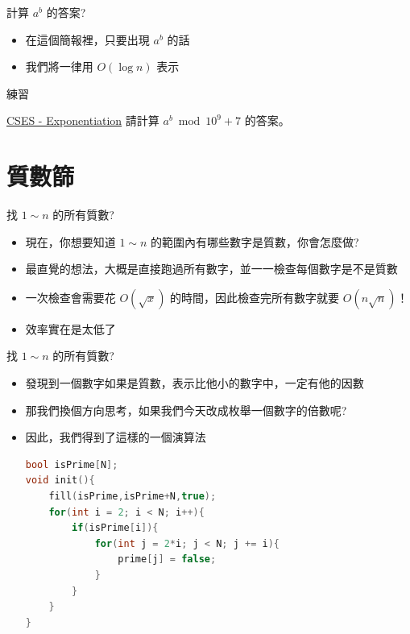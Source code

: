 \documentclass[aspectratio=169]{beamer}
\begin{document}
    \begin{frame}[fragile]{計算 $a^b$ 的答案?}
        \begin{itemize}
            \item 在這個簡報裡，只要出現 $a^b$ 的話
            \item 我們將一律用 $O(\log n)$ 表示
        \end{itemize}
    \end{frame}
    
    \begin{frame}[fragile]{練習}
        \begin{block}{\href{https://cses.fi/problemset/task/1095}{CSES - Exponentiation}}
            請計算 $a^b \bmod 10^9+7$ 的答案。
        \end{block}
    \end{frame}
    
    \section{質數篩}
    
    \begin{frame}{找 $1 \sim n$ 的所有質數?}
        \begin{itemize}
            \item 現在，你想要知道 $1 \sim n$ 的範圍內有哪些數字是質數，你會怎麼做?
            \item<2-> 最直覺的想法，大概是直接跑過所有數字，並一一檢查每個數字是不是質數
            \item<3-> 一次檢查會需要花 $O(\sqrt{x})$ 的時間，因此檢查完所有數字就要 $O(n \sqrt{n})$！
            \item<4-> 效率實在是太低了
        \end{itemize}
    \end{frame}
    
    \begin{frame}[fragile]{找 $1 \sim n$ 的所有質數?}
        \begin{itemize}
            \item 發現到一個數字如果是質數，表示比他小的數字中，一定有他的因數
            \item<2-> 那我們換個方向思考，如果我們今天改成枚舉一個數字的倍數呢?
            \item<3-> 因此，我們得到了這樣的一個演算法
            \begin{lstlisting}[language=C++,basicstyle=\ttfamily\small]
bool isPrime[N];
void init(){
    fill(isPrime,isPrime+N,true);
    for(int i = 2; i < N; i++){
        if(isPrime[i]){
            for(int j = 2*i; j < N; j += i){
                prime[j] = false; 
            }
        }
    }
}
            \end{lstlisting}
        \end{itemize}
    \end{frame}
    
\end{document}
